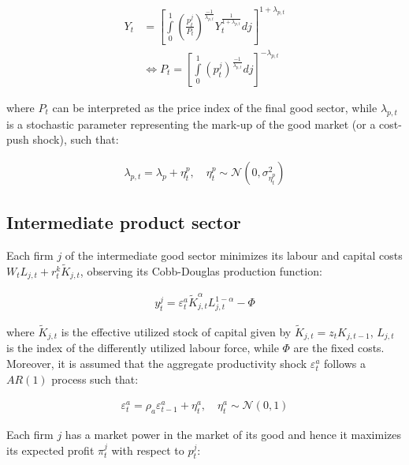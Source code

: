 \documentclass{pracamgr}
\numberwithin{equation}{section}
\begin{document}
\begin{align} \label{Optimal prices for firm}
Y_{t} &=  \left[ \int\limits_{0}^{1} \left( \frac{ p_{t}^{j}}{P_{t}} \right)^{\frac{-1}{\lambda_{p,t}}} Y_{t}^\frac{1}{1+\lambda_{p,t}} dj \right]^{1+\lambda_{p,t}} \nonumber \\
& \iff P_{t} = \left[ \int\limits_{0}^{1} \left( p_{t}^{j} \right)^{\frac{-1}{\lambda_{p,t}}} dj \right]^{-\lambda_{p,t}}
\end{align}

where $P_{t}$ can be interpreted as the price index of the final good sector, while $\lambda_{p,t}$ is a stochastic parameter representing the mark-up of the good market (or a cost-push shock), such that:

\begin{align}
\lambda_{p,t} = \lambda_{p} + \eta_{t}^{p}, \quad \eta_{t}^{p} \sim \mathcal{N} \left(0, \sigma^{2}_{\eta_{t}^{p}} \right)
\end{align}

\subsection{Intermediate product sector} \label{DSGE - Firms - Intermediate product sector}

Each firm $j$ of the intermediate good sector minimizes its labour and capital costs $W_{t}L_{j,t} + r_{t}^{k} \widetilde{K}_{j,t}$, observing its Cobb-Douglas production function:

\begin{align}
y_{t}^{j} = \varepsilon_{t}^{a} \widetilde{K}_{j,t}^{\alpha} L_{j,t}^{1-\alpha} - \Phi
\end{align}

where $\widetilde{K}_{j,t}$ is the effective utilized stock of capital given by $\widetilde{K}_{j,t} = z_{t}K_{j,t-1}$, $L_{j,t}$ is the index of the differently utilized labour force, while $\Phi$ are the fixed costs. Moreover, it is assumed that the aggregate productivity shock $\varepsilon_{t}^{a}$ follows a $AR(1)$ process such that:

\begin{align}
\varepsilon_{t}^{a} = \rho_{a} \varepsilon_{t-1}^{a} + \eta_{t}^{a}, \quad \eta_{t}^{a} \sim \mathcal{N}(0,1)
\end{align}

Each firm $j$ has a market power in the market of its good and hence it maximizes its expected profit $\pi_{t}^{j}$ with respect to $p_{t}^{j}$:
\end{document}
